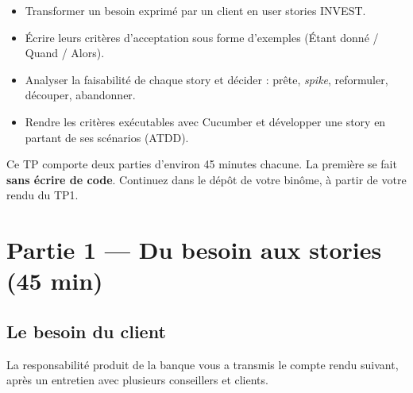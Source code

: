 \documentclass[11pt]{article}
\begin{document}

\begin{infobox}[Objectifs]
\begin{itemize}[leftmargin=1.2em, itemsep=1pt]
  \item Transformer un besoin exprimé par un client en user stories INVEST.
  \item Écrire leurs critères d'acceptation sous forme d'exemples (Étant donné / Quand / Alors).
  \item Analyser la faisabilité de chaque story et décider : prête, \textit{spike}, reformuler, découper, abandonner.
  \item Rendre les critères exécutables avec Cucumber et développer une story en partant de ses scénarios (ATDD).
\end{itemize}
\end{infobox}

Ce TP comporte deux parties d'environ 45 minutes chacune. La première se fait \textbf{sans écrire de code}. Continuez dans le dépôt de votre binôme, à partir de votre rendu du TP1.

\section{Partie 1 --- Du besoin aux stories (45 min)}

\subsection*{Le besoin du client}

La responsabilité produit de la banque vous a transmis le compte rendu suivant, après un entretien avec plusieurs conseillers et clients.
\end{document}
